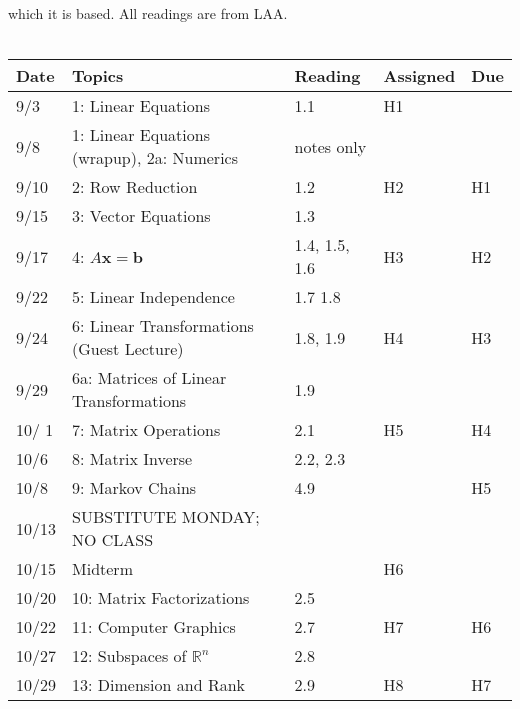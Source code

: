 \documentclass[11pt]{article}
\begin{document}
which it is based.   All readings are from LAA.
\\~\\
\small
\begin{centering}
\begin{tabular}{||l|p{3in}|l|l|l||}
\hline\hline
Date & Topics  & Reading & Assigned & Due  \\
\hline\hline
9/3 & 1: Linear Equations & 1.1 & H1  & \\
\hline

9/8 & 1: Linear Equations (wrapup), 2a: Numerics &  notes only &  & \\
9/10 &  2: Row Reduction & 1.2 & H2 & H1 \\
\hline

9/15 & 3: Vector Equations  & 1.3 &  & \\
9/17 & 4: $A\mathbf{x} =\mathbf{b}$   & 1.4, 1.5, 1.6 & H3 & H2 \\ %
\hline

9/22 & 5: Linear Independence  & 1.7 1.8 & & \\
9/24 & 6: Linear Transformations  (Guest Lecture) &  1.8, 1.9 & H4 & H3\\ 
\hline

9/29 & 6a: Matrices of Linear Transformations & 1.9 & & \\  
10/ 1 &7: Matrix Operations   & 2.1 & H5 & H4 \\ 
\hline

10/6 & 8: Matrix Inverse  & 2.2, 2.3 & &  \\   
10/8 &9: Markov Chains  &4.9 & & H5 \\ %
\hline

% 
10/13 & SUBSTITUTE MONDAY; NO CLASS &&&\\
10/15 & Midterm & & H6 &\\
\hline

10/20 & 10: Matrix Factorizations  & 2.5 & &\\ 
10/22 & 11: Computer Graphics  & 2.7 & H7& H6\\ 
\hline

10/27 & 12: Subspaces of $\mathbb{R}^n$  & 2.8 &  &\\ 
10/29 & 13: Dimension and Rank  & 2.9 & H8 & H7\\ 
\hline


\end{tabular}
\end{centering}
\end{document}
